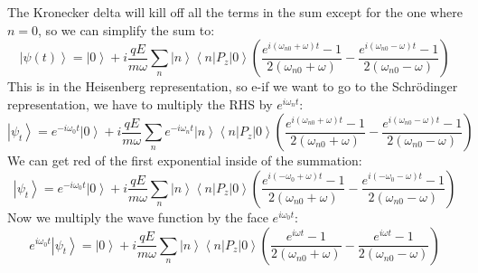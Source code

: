 \documentclass[12pt]{article}
\begin{document}
The Kronecker delta will kill off all the terms in the sum except for the one where $n=0$, so we can simplify the sum to:
\begin{equation}
\left|\psi(t)\right\rangle = \left|0\right\rangle +i \frac{q E}{m \omega} \sum_{n} \left|n\right\rangle \left\langle n\left|P_{z}\right|0\right\rangle \left( \frac{e^{i (\omega _{n0} + \omega) t} - 1}{2 (\omega _{n0} + \omega)} - \frac{e^{i (\omega _{n0} - \omega) t} - 1}{2 (\omega _{n0} - \omega)} \right)
\end{equation}
This is in the Heisenberg representation, so e-if we want to go to the Schrödinger representation, we have to multiply the RHS by $e^{i\omega_n t}$:
\begin{equation}
\left|\psi_t\right\rangle = e^{-i\omega_{0} t} \left|0\right\rangle +i \frac{q E}{m \omega} \sum_{n} e^{-i\omega_n t} \left|n\right\rangle \left\langle n\left|P_{z}\right|0\right\rangle \left( \frac{e^{i (\omega _{n0} + \omega) t} - 1}{2 (\omega _{n0} + \omega)} - \frac{e^{i (\omega _{n0} - \omega) t} - 1}{2 (\omega _{n0} - \omega)} \right)
\end{equation}
We can get red of the first exponential inside of the summation:
\begin{equation}
\left|\psi_t\right\rangle = e^{-i\omega_{0} t} \left|0\right\rangle +i \frac{q E}{m \omega} \sum_{n} \left|n\right\rangle \left\langle n\left|P_{z}\right|0\right\rangle \left( \frac{e^{i (-\omega _{0} + \omega) t} - 1}{2 (\omega _{n0} + \omega)} - \frac{e^{i (-\omega_0 - \omega) t} - 1}{2 (\omega _{n0} - \omega)} \right)
\end{equation}
Now we multiply the wave function by the face $e^{i\omega_0 t}$:
\begin{equation}
e^{i\omega_0 t}\left|\psi_t\right\rangle = \left|0\right\rangle +i \frac{q E}{m \omega} \sum_{n} \left|n\right\rangle \left\langle n\left|P_{z}\right|0\right\rangle \left( \frac{e^{i\omega t}-1}{2 (\omega _{n0} + \omega)} - \frac{e^{i\omega t}-1}{2 (\omega _{n0} - \omega)} \right)
\end{equation}
\end{document}
